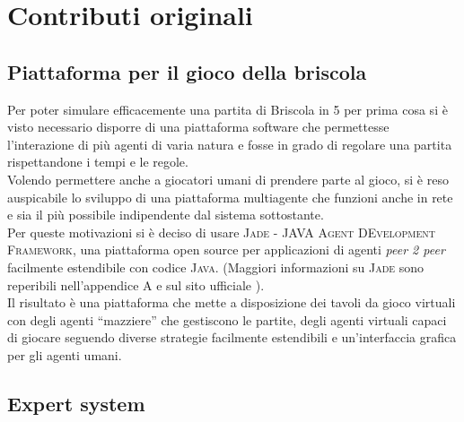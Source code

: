 
\section{Contributi originali}
\subsection{Piattaforma per il gioco della briscola}
Per poter simulare efficacemente una partita di Briscola in 5 per prima cosa si è visto necessario disporre di una piattaforma software che permettesse l'interazione di più agenti di varia natura e fosse in grado di regolare una partita rispettandone i tempi e le regole.\\
Volendo permettere anche a giocatori umani di prendere parte al gioco, si è reso auspicabile lo sviluppo di una piattaforma multiagente che funzioni anche in rete e sia il più possibile indipendente dal sistema sottostante.\\
Per queste motivazioni si è deciso di usare \textsc{Jade - JAVA Agent DEvelopment Framework}, una piattaforma open source per applicazioni di agenti \emph{peer 2 peer} facilmente estendibile con codice \textsc{Java}.
(Maggiori informazioni su \textsc{Jade} sono reperibili nell'appendice A e sul sito ufficiale \cite{jade}).\\
Il risultato è una piattaforma che mette a disposizione dei tavoli da gioco virtuali con degli agenti ``mazziere'' che gestiscono le partite, degli agenti virtuali capaci di giocare seguendo diverse strategie facilmente estendibili e un'interfaccia grafica per gli agenti umani.

\subsection{Expert system}

